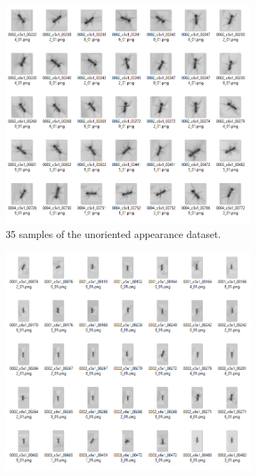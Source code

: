 \FloatBarrier

\begin{figure}[!htp]
    \centering
    \begin{subfigure}[b]{0.4\linewidth}
        \includegraphics[width=\linewidth]{figures/05_methodology/Market_unoriented.png}
        \caption[Samples of the unoriented appearance dataset]{\footnotesize{35 samples of the unoriented appearance dataset.}}
        \label{fig:unoriented appearance}
    \end{subfigure}
    \hspace{0.025\linewidth}
    \begin{subfigure}[b]{0.4\linewidth}
        \includegraphics[width=\linewidth]{figures/05_methodology/Market_oriented.png}

\end{subfigure}
\end{figure}
